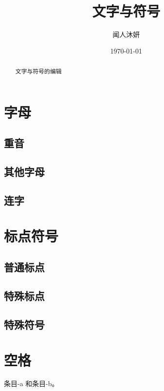 \documentclass[UTF8]{ctexart}
\title{文字与符号}
\author{闻人沐妍}
\date{\today}
\begin{document}
    \maketitle

    \begin{abstract}
        文字与符号的编辑
    \end{abstract}

    \tableofcontents

    \section{字母}
        \subsection{重音}

        \subsection{其他字母}
        
        \subsection{连字}

    \section{标点符号}
        \subsection{普通标点}

        \subsection{特殊标点}

        \subsection{特殊符号}

    \section{空格}
        \mbox{条目}-a 和条目-b。
\end{document}
